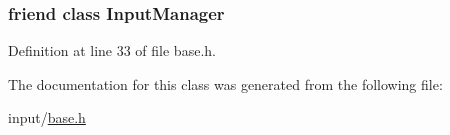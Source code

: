 \subsubsection[{Input\+Manager}]{\setlength{\rightskip}{0pt plus 5cm}friend class {\bf Input\+Manager}\hspace{0.3cm}{\ttfamily [friend]}}\label{class_tri_1_1_input_1_1_input_object_af0e8c3dcc20b7ddcaf63506363a22821}


Definition at line 33 of file base.\+h.



The documentation for this class was generated from the following file\+:\begin{DoxyCompactItemize}
\item 
input/\hyperlink{base_8h}{base.\+h}\end{DoxyCompactItemize}
